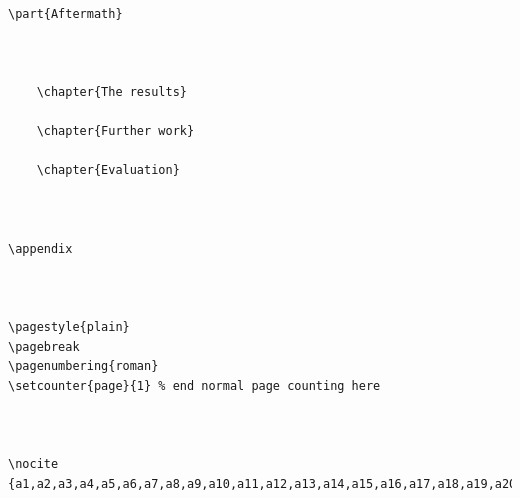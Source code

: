 \documentclass[12pt]{report}
\begin{document}
\begin{verbatim}
	

	
	
	
	
\part{Aftermath}

	
		
	\chapter{The results}
		
	\chapter{Further work}
	
	\chapter{Evaluation}
	
	

\appendix

	

\pagestyle{plain}
\pagebreak
\pagenumbering{roman}
\setcounter{page}{1} % end normal page counting here



\nocite {a1,a2,a3,a4,a5,a6,a7,a8,a9,a10,a11,a12,a13,a14,a15,a16,a17,a18,a19,a20,a21}
	

	
\end{verbatim}
\end{document}
